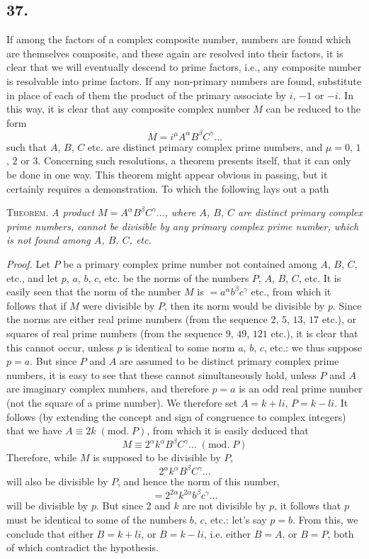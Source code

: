 \documentclass[twoside,12pt]{memoir}
\renewcommand{\pmod}[1]{\;(\textrm{mod.}\;#1)}
\begin{document}
\subsection*{37.}

If among the factors of a complex composite number, numbers are found which are themselves composite, and these again are resolved into their factors, it is clear that we will eventually descend to prime factors, i{.}e{.}, any composite number is resolvable into prime factors. If any non-primary numbers are found, substitute in place of each of them the product of the primary associate by \(i\), \(-1\) or \(-i\). In this way, it is clear that any composite complex number \(M\) can be reduced to the form
\[M=i^{\mu} A^{\alpha} B^{\beta} C^{\gamma} \ldots\]
such that \(A\), \(B\), \(C\) etc{.} are distinct primary complex prime numbers, and \(\mu=0\), \(1\), \(2\) or \(3\). Concerning such resolutions, a theorem presents itself, that it can only be done in one way.  This theorem might appear obvious in passing, but it certainly requires a demonstration. To which the following lays out a path
%

\textsc{Theorem.} \textit{A product \(M=A^{\alpha} B^{\beta} C^{\gamma} \ldots\), where \(A\), \(B\), \(C\) are distinct primary complex prime numbers, cannot be divisible by any primary complex prime number, which is not found among \(A\), \(B\), \(C\), etc{.}}
 
\textit{Proof.} Let \(P\) be a primary complex prime number not contained among \(A\), \(B\), \(C\), etc{.}, and let \(p\), \(a\), \(b\), \(c\), etc{.} be the norms of the numbers \(P\), \(A\), \(B\), \(C\), etc{.} It is easily seen that the norm of the number \(M\) is \(=a^{\alpha} b^{\beta} c^{\gamma}\) etc{.}, from which it follows that if \(M\) were divisible by \({P}\), then its norm would be divisible by \(p\). Since the norms are either real prime numbers (from the sequence \(2\), \(5\), \(13\), \(17\) etc{.}), or squares of real prime numbers (from the sequence \(9\), \(49\), \(121\) etc{.}), it is clear that this cannot occur, unless \(p\) is identical to some norm \(a\), \(b\), \(c\), etc{.}: we thus suppose \(p=a\). But since \(P\) and \(A\) are assumed to be distinct primary complex prime numbers, it is easy to see that these cannot simultaneously hold, unless \(P\) and \(A\) are imaginary complex numbers, and therefore \(p=a\) is an odd real prime number (not the square of a prime number).  We therefore set \(A=k+l i\), \(P=k-l i\).  It follows (by extending the concept and sign of congruence to complex integers) that we have \(A \equiv 2 k\pmod{P}\), from which it is easily deduced that
\[M \equiv 2^{\alpha} k^{\alpha} B^{\beta} C^{\gamma} \ldots\pmod{P}\]
Therefore, while \(M\) is supposed to be divisible by \(P\),
\[2^{\alpha} k^{\alpha} B^{\beta} C^{\gamma} \ldots\]
will also be divisible by \(P\), and hence the norm of this number,
\[=2^{2 \alpha} k^{2 \alpha} b^{\beta} c^{\gamma} \ldots\]
will be divisible by \(p\). But since 2 and \(k\) are not divisible by \(p\), it follows that \(p\) must be identical to some of the numbers \(b\), \(c\), etc{.}: let's say \(p=b\). From this, we conclude that either \(B=k+l i\), or \(B=k-l i\), i{.}e{.} either \(B=A\), or \(B=P\), both of which contradict the hypothesis.
 
\end{document}
